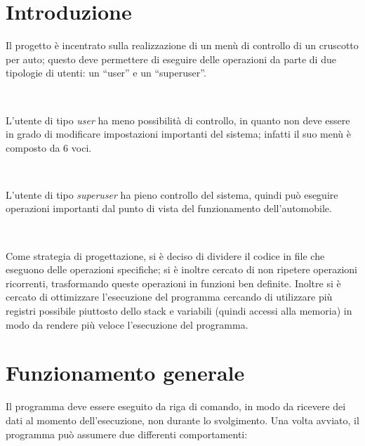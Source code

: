\documentclass[a4paper,titlepage]{book}
\begin{document}
\begin{frontespizio}


\end{frontespizio}

\tableofcontents



\chapter{Introduzione}

Il progetto è incentrato sulla realizzazione di un menù di controllo di un cruscotto per auto; questo deve permettere di eseguire delle operazioni da parte di due tipologie di utenti: un ``user'' e un ``superuser''.

~

L'utente di tipo \textit{user} ha meno possibilità di controllo, in quanto non deve essere in grado di modificare impostazioni importanti del sistema; infatti il suo menù è composto da 6 voci.

~

L'utente di tipo \textit{superuser} ha pieno controllo del sistema, quindi può eseguire operazioni importanti dal punto di vista del funzionamento dell'automobile.

~

Come strategia di progettazione, si è deciso di dividere il codice in file che eseguono delle operazioni specifiche; si è inoltre cercato di non ripetere operazioni ricorrenti, trasformando queste operazioni in funzioni ben definite. Inoltre si è cercato di ottimizzare l'esecuzione del programma cercando di utilizzare più registri possibile piuttosto dello stack e variabili (quindi accessi alla memoria) in modo da rendere più veloce l'esecuzione del programma. 

\chapter{Funzionamento generale}

Il programma deve essere eseguito da riga di comando, in modo da ricevere dei dati al momento dell'esecuzione, non durante lo svolgimento. Una volta avviato, il programma può assumere due differenti comportamenti:
\end{document}
